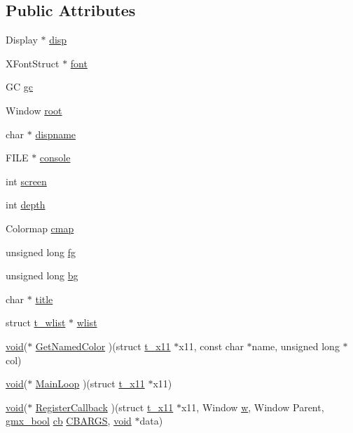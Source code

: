\subsection*{\-Public \-Attributes}
\begin{DoxyCompactItemize}
\item 
\-Display $\ast$ \hyperlink{structt__x11_a281e044ea18dc7782936124bfdfac479}{disp}
\item 
\-X\-Font\-Struct $\ast$ \hyperlink{structt__x11_a96e2df6c6351c642bff62d9c45e83339}{font}
\item 
\-G\-C \hyperlink{structt__x11_afc9837841aa94e27b363e943018af040}{gc}
\item 
\-Window \hyperlink{structt__x11_a7ff1559d629e530df5afe5a306b7b2e3}{root}
\item 
char $\ast$ \hyperlink{structt__x11_a1fad3cfb76707aaa695fd0e160b67962}{dispname}
\item 
\-F\-I\-L\-E $\ast$ \hyperlink{structt__x11_ab8a0ae19197454df24a1f3722e665672}{console}
\item 
int \hyperlink{structt__x11_a545c707e3904756dfc63d085272d789b}{screen}
\item 
int \hyperlink{structt__x11_a5590b87c02702cb59e2d020d3d364292}{depth}
\item 
\-Colormap \hyperlink{structt__x11_abb881fde5335821452d6e309d6c69893}{cmap}
\item 
unsigned long \hyperlink{structt__x11_ad2abe20e3e164fa1ed9832dae3926993}{fg}
\item 
unsigned long \hyperlink{structt__x11_a93e4e1df05f860b62ac9bdbdd80bf695}{bg}
\item 
char $\ast$ \hyperlink{structt__x11_a16992eb651ec694e9075960da372be64}{title}
\item 
struct \hyperlink{structt__wlist}{t\-\_\-wlist} $\ast$ \hyperlink{structt__x11_ad27334830eb71819cb56bc360f3feac7}{wlist}
\item 
\hyperlink{nbnxn__kernel__simd__4xn__outer_8h_a8dc3f4a797ed992dff49d2fa3477eee8}{void}($\ast$ \hyperlink{structt__x11_a30f4b5c0c05ceea3ec04a2110eeef455}{\-Get\-Named\-Color} )(struct \hyperlink{structt__x11}{t\-\_\-x11} $\ast$x11, const char $\ast$name, unsigned long $\ast$col)
\item 
\hyperlink{nbnxn__kernel__simd__4xn__outer_8h_a8dc3f4a797ed992dff49d2fa3477eee8}{void}($\ast$ \hyperlink{structt__x11_a0e0ef020556244f7d953f092b60bbb28}{\-Main\-Loop} )(struct \hyperlink{structt__x11}{t\-\_\-x11} $\ast$x11)
\item 
\hyperlink{nbnxn__kernel__simd__4xn__outer_8h_a8dc3f4a797ed992dff49d2fa3477eee8}{void}($\ast$ \hyperlink{structt__x11_a2d9f4f4ac23e7c23225dadabba0fd35b}{\-Register\-Callback} )(struct \hyperlink{structt__x11}{t\-\_\-x11} $\ast$x11, \-Window \hyperlink{share_2template_2gromacs_2gmx__lapack_8h_adf78cb898ff892dd3fa9c4a1da899392}{w}, \-Window \-Parent, \hyperlink{include_2types_2simple_8h_a8fddad319f226e856400d190198d5151}{gmx\-\_\-bool} \hyperlink{gmx__potential_8c_a049ca270a9d47f66f61c97b0d9be5a20}{cb} \hyperlink{x11_8h_ab7978cf2ea60147286d4b310d0a1bc42}{\-C\-B\-A\-R\-G\-S}, \hyperlink{nbnxn__kernel__simd__4xn__outer_8h_a8dc3f4a797ed992dff49d2fa3477eee8}{void} $\ast$data)

\end{DoxyCompactItemize}
